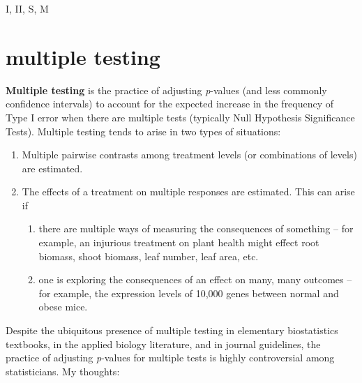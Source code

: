 \documentclass[]{book}
\providecommand{\tightlist}{%
  \setlength{\itemsep}{0pt}\setlength{\parskip}{0pt}}
\begin{document}
I, II, S, M

\hypertarget{multiple-testing}{%
\section{multiple testing}\label{multiple-testing}}

\textbf{Multiple testing} is the practice of adjusting \emph{p}-values (and less commonly confidence intervals) to account for the expected increase in the frequency of Type I error when there are multiple tests (typically Null Hypothesis Significance Tests). Multiple testing tends to arise in two types of situations:

\begin{enumerate}
\def\labelenumi{\arabic{enumi}.}
\tightlist
\item
  Multiple pairwise contrasts among treatment levels (or combinations of levels) are estimated.
\item
  The effects of a treatment on multiple responses are estimated. This can arise if

  \begin{enumerate}
  \def\labelenumii{\alph{enumii}.}
  \tightlist
  \item
    there are multiple ways of measuring the consequences of something -- for example, an injurious treatment on plant health might effect root biomass, shoot biomass, leaf number, leaf area, etc.
  \item
    one is exploring the consequences of an effect on many, many outcomes -- for example, the expression levels of 10,000 genes between normal and obese mice.
  \end{enumerate}
\end{enumerate}

Despite the ubiquitous presence of multiple testing in elementary biostatistics textbooks, in the applied biology literature, and in journal guidelines, the practice of adjusting \emph{p}-values for multiple tests is highly controversial among statisticians. My thoughts:
\end{document}
